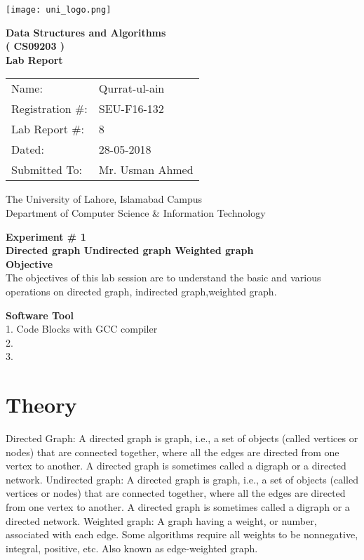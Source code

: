 \documentclass[11pt]{article}            %
\begin{document}
\begin{titlepage}
    \centering
  \vfill
    \texttt{[image: uni\_logo.png]} \\ 
	\vskip2cm
    {\bfseries\Large
	Data Structures and Algorithms \\ ( CS09203 )\\
	
	\vskip2cm
	Lab Report 
	 
	\vskip2cm
	}    

\begin{center}
\begin{tabular}{ l l  } 

Name: & Qurrat-ul-ain  \\ 
Registration \#: & SEU-F16-132 \\ 
Lab Report \#: & 8 \\ 
 Dated:& 28-05-2018\\ 
Submitted To:& Mr. Usman Ahmed\\ 

\end{tabular}
\end{center}
    \vfill
    The University of Lahore, Islamabad Campus\\
Department of Computer Science \& Information Technology
\end{titlepage}


    
    {\bfseries\Large
\centering
	Experiment \# 1 \\

Directed graph
Undirected graph
Weighted graph\\
	
	}    
 \vskip1cm
 \textbf {Objective}\\ The objectives of this lab session are to understand the basic and various operations on directed graph, indirected graph,weighted graph. 
 
 \textbf {Software Tool}\\
1. Code Blocks with GCC compiler\\
2. \\
3. \\

\section{Theory }             Directed Graph:
A directed graph is graph, i.e., a set of objects (called vertices or nodes) that are connected together, where all the edges are directed from one vertex to another. A directed graph is sometimes called a digraph or a directed network.
Undirected graph:
A directed graph is graph, i.e., a set of objects (called vertices or nodes) that are connected together, where all the edges are directed from one vertex to another. A directed graph is sometimes called a digraph or a directed network.
Weighted graph:
 A graph having a weight, or number, associated with each edge. Some algorithms require all weights to be nonnegative, integral, positive, etc. Also known as edge-weighted graph.
\end{document}
